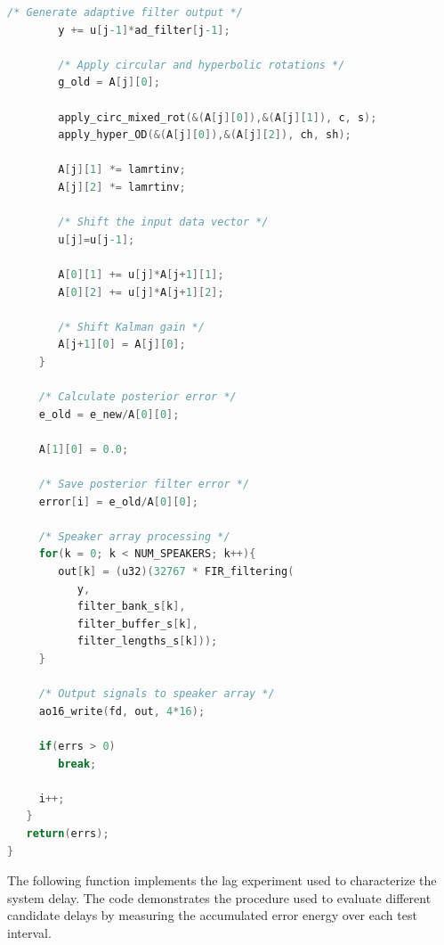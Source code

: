 \begin{lstlisting}[language=C]
        /* Generate adaptive filter output */
        y += u[j-1]*ad_filter[j-1];

        /* Apply circular and hyperbolic rotations */
        g_old = A[j][0];

        apply_circ_mixed_rot(&(A[j][0]),&(A[j][1]), c, s);
        apply_hyper_OD(&(A[j][0]),&(A[j][2]), ch, sh);

        A[j][1] *= lamrtinv;
        A[j][2] *= lamrtinv;

        /* Shift the input data vector */
        u[j]=u[j-1];

        A[0][1] += u[j]*A[j+1][1];
        A[0][2] += u[j]*A[j+1][2];

        /* Shift Kalman gain */
        A[j+1][0] = A[j][0];
     }

     /* Calculate posterior error */
     e_old = e_new/A[0][0];

     A[1][0] = 0.0;

     /* Save posterior filter error */
     error[i] = e_old/A[0][0];

     /* Speaker array processing */
     for(k = 0; k < NUM_SPEAKERS; k++){
        out[k] = (u32)(32767 * FIR_filtering(
           y,
           filter_bank_s[k],
           filter_buffer_s[k],
           filter_lengths_s[k]));
     }

     /* Output signals to speaker array */
     ao16_write(fd, out, 4*16);

     if(errs > 0)
        break;

     i++;
   }
   return(errs);
}
\end{lstlisting}

The following function implements the lag experiment used to characterize the system delay. The code demonstrates the procedure used to evaluate different candidate delays by measuring the accumulated error energy over each test interval.

